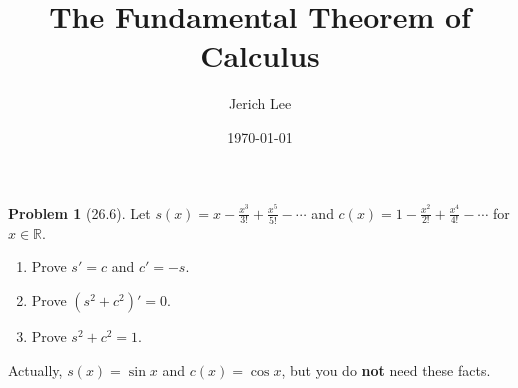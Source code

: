 \documentclass[12pt]{article}
\title{The Fundamental Theorem of Calculus}
\author{Jerich Lee}
\date{\today}
\theoremstyle{definition} %
\newtheorem{problem}{Problem}
\theoremstyle{plain} %
\begin{document}
\maketitle
\begin{problem}[26.6]
    \noindent 
    Let $ s(x) = x - \frac{x^3}{3!} + \frac{x^5}{5!} - \cdots $ and $ c(x) = 1 - \frac{x^2}{2!} + \frac{x^4}{4!} - \cdots $ for $ x \in \mathbb{R} $.
    \begin{enumerate}
        \item Prove $ s' = c $ and $ c' = -s $.
        \item Prove $ (s^2 + c^2)' = 0 $.
        \item Prove $ s^2 + c^2 = 1 $.
    \end{enumerate}
    
    Actually, $ s(x) = \sin x $ and $ c(x) = \cos x $, but you do \textbf{not} need these facts.
\end{problem}
\end{document}
